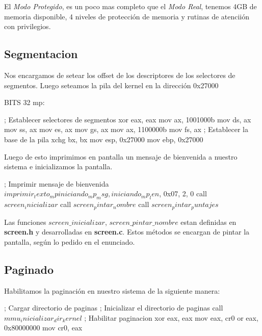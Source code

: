El \textit{Modo Protegido}, es un poco mas completo que el \textit{Modo Real}, tenemos 4GB de memoria disponible, 4 niveles de protecci\'on de memoria y rutinas de atencii\'on con privilegios.

\subsection{Segmentacion}
Nos encargamos de setear los offset de los descriptores de los selectores de segmentos. Luego seteamos la pila del kernel en la direcci\'on 0x27000

\begin{algorithmic}
\State \tab BITS 32
\State \tab mp:

    \State \tab \tab ; Establecer selectores de segmentos
    \State \tab \tab xor eax, eax
    \State \tab \tab  mov ax, 1001000b
    \State \tab \tab  mov ds, ax
    \State \tab \tab  mov ss, ax
    \State \tab \tab  mov es, ax
    \State \tab \tab  mov gs, ax
    \State \tab \tab  mov ax, 1100000b
    \State \tab \tab  mov fs, ax
    \State \tab \tab  ; Establecer la base de la pila
    \State \tab \tab  xchg bx, bx
    \State \tab \tab  mov esp, 0x27000
    \State \tab \tab  mov ebp, 0x27000
\end{algorithmic}

Luego de esto imprimimos en pantalla un mensaje de bienvenida a nuestro sistema e inicializamos la pantalla.
\begin{algorithmic}
    \State \tab \tab ; Imprimir mensaje de bienvenida
    \State \tab \tab $imprimir_texto_mp iniciando_mp_msg, iniciando_mp_len$, 0x07, 2, 0
    \State \tab \tab call $screen_inicializar$
    \State \tab \tab call $screen_pintar_nombre$
    \State \tab \tab call $screen_pintar_puntajes$
\end{algorithmic}

Las funciones \textit{$screen\_inicializar$}, \textit{$screen\_pintar\_nombre$} estan definidas en \textbf{screen.h} y desarrolladas en \textbf{screen.c}. Estos m\'etodos se encargan de pintar la pantalla, seg\'un lo pedido en el enunciado.

\subsection{Paginado}
Habilitamos la paginaci\'on en nuestro sistema de la siguiente manera:
\begin{algorithmic}
    \State \tab ; Cargar directorio de paginas
    \State \tab ; Inicializar el directorio de paginas
    \State \tab call $mmu_inicializar_dir_kernel$
    \State \tab ; Habilitar paginacion
    \State \tab xor eax, eax
    \State \tab mov eax, cr0
    \State \tab or eax, 0x80000000
    \State \tab mov cr0, eax
\end{algorithmic}

